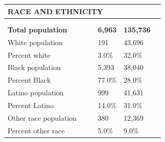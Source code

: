 \documentclass[9pt]{report}
\begin{document}
\vspace{12pt}
\setlength{\tabcolsep}{.01in} %
\begin{tabular}{p{.10in}p{.10in}p{.10in}p{3.7in}>{\hfill}p{.85in}>{\hfill}p{.85in}>{\hfill}p{.85in}>{\hfill}p{.85in}p{0.1in}}
\multicolumn{9}{l}{\parbox{7.1in}{\raggedright{\large{\strut\textbf{RACE AND ETHNICITY}\strut}}}} \\ 
\hline
\multicolumn{4}{l}{\parbox{3.5in}{\raggedright{\textbf{}}}} & \multicolumn{1}{r}{\parbox{.85in}{\strut\raggedleft{\textbf{}\strut}}} & \multicolumn{1}{r}{\parbox{.85in}{\strut\raggedleft{\textbf{}\strut}}} & \multicolumn{1}{r}{\parbox{.85in}{\strut{}}} & \multicolumn{1}{r}{\parbox{.85in}{\strut{}}} & \\ 
\multicolumn{9}{l}{} \\ 
\multicolumn{4}{l}{\parbox{3.5in}{\strut\raggedright{\textbf{Total population}\strut}}} & \textbf{} & \textbf{} & \textbf{6,963} & \textbf{135,736} & \textbf{} \\ 
\multicolumn{4}{l}{\parbox{3.6in}{\strut\raggedright{{White population}}\strut}} &  &  & 191 & 43,696 & \multicolumn{1}{l}{}  \\ 
\multicolumn{4}{l}{\parbox{3.6in}{\strut\raggedright{{Percent white}}\strut}} &  &  & 3.0\% & 32.0\% & \multicolumn{1}{l}{}  \\ 
\multicolumn{4}{l}{\parbox{3.6in}{\strut\raggedright{{Black population}}\strut}} &  &  & 5,393 & 38,040 & \multicolumn{1}{l}{}  \\ 
\multicolumn{4}{l}{\parbox{3.6in}{\strut\raggedright{{Percent Black}}\strut}} &  &  & 77.0\% & 28.0\% & \multicolumn{1}{l}{}  \\ 
\multicolumn{4}{l}{\parbox{3.6in}{\strut\raggedright{{Latino population}}\strut}} &  &  & 999 & 41,631 & \multicolumn{1}{l}{}  \\ 
\multicolumn{4}{l}{\parbox{3.6in}{\strut\raggedright{{Percent Latino}}\strut}} &  &  & 14.0\% & 31.0\% & \multicolumn{1}{l}{}  \\ 
\multicolumn{4}{l}{\parbox{3.6in}{\strut\raggedright{{Other race population}}\strut}} &  &  & 380 & 12,369 & \multicolumn{1}{l}{}  \\ 
\multicolumn{4}{l}{\parbox{3.6in}{\strut\raggedright{{Percent other race}}\strut}} &  &  & 5.0\% & 9.0\% & \multicolumn{1}{l}{}  \\ 

\end{tabular}
\setlength{\tabcolsep}{6pt} %
\end{document}
